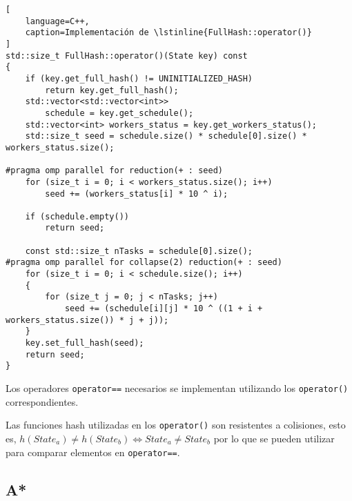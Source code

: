 \begin{lstlisting}[
    language=C++,
    caption=Implementación de \lstinline{FullHash::operator()}
]
std::size_t FullHash::operator()(State key) const
{
    if (key.get_full_hash() != UNINITIALIZED_HASH)
        return key.get_full_hash();
    std::vector<std::vector<int>>
        schedule = key.get_schedule();
    std::vector<int> workers_status = key.get_workers_status();
    std::size_t seed = schedule.size() * schedule[0].size() * workers_status.size();

#pragma omp parallel for reduction(+ : seed)
    for (size_t i = 0; i < workers_status.size(); i++)
        seed += (workers_status[i] * 10 ^ i);

    if (schedule.empty())
        return seed;

    const std::size_t nTasks = schedule[0].size();
#pragma omp parallel for collapse(2) reduction(+ : seed)
    for (size_t i = 0; i < schedule.size(); i++)
    {
        for (size_t j = 0; j < nTasks; j++)
            seed += (schedule[i][j] * 10 ^ ((1 + i + workers_status.size()) * j + j));
    }
    key.set_full_hash(seed);
    return seed;
}
\end{lstlisting}

Los operadores \lstinline{operator==} necesarios se implementan utilizando
los \lstinline{operator()} correspondientes.

\begin{notebox}
    Las funciones hash utilizadas en los \lstinline{operator()}
    son resistentes a colisiones,
    esto es, $
    h(State_a) \ne h(State_b) \iff State_a \ne State_b
    $
    por lo que se pueden
    utilizar para comparar elementos en \lstinline{operator==}.
\end{notebox}

\subsection{A*}

